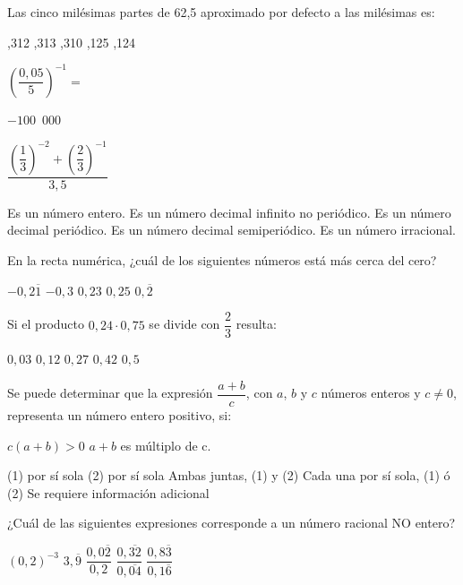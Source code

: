 \documentclass[pagina vacia]{srs}
\begin{document}
\begin{preguntas}[after-item-skip=1cm]
\pregunta Las cinco milésimas partes de 62,5 aproximado por defecto a las milésimas es:
\begin{vertical}
,312
,313
,310
,125
,124
\end{vertical}

\pregunta \( \left(\dfrac{0,05}{5}\right)^{-1} = \)
\begin{vertical}
\alternativa $-100$
\,000
\end{vertical}

\pregunta \( \dfrac{\left(\dfrac{1}{3}\right)^{-2} + \left(\dfrac{2}{3}\right)^{-1}}{3,5} \)
\begin{vertical}
\alternativa Es un número entero.
\alternativa Es un número decimal infinito no periódico.
\alternativa Es un número decimal periódico.
\alternativa Es un número decimal semiperiódico.
\alternativa Es un número irracional.
\end{vertical}

\pregunta En la recta numérica, ¿cuál de los siguientes números está más cerca del cero?
\begin{vertical}
\alternativa $-0,2\overline{1}$
\alternativa $-0,3$
\alternativa $0,23$
\alternativa $0,25$
\alternativa $0,\overline{2}$
\end{vertical}

\pregunta Si el producto \(0,24 \cdot 0,75\) se divide con \(\dfrac{2}{3}\) resulta:
\begin{vertical}
\alternativa $0,03$
\alternativa $0,12$
\alternativa $0,27$
\alternativa $0,42$
\alternativa $0,5$
\end{vertical}

\pregunta Se puede determinar que la expresión \(\dfrac{a+b}{c}\), con $a$, $b$ y $c$ números enteros
y \(c \neq 0\), representa un número entero positivo, si:
\begin{verticaln}
\alternativa \(c\left(a + b\right)>0\)
\alternativa \(a + b\) es múltiplo de c.
\end{verticaln}
\begin{vertical}
\alternativa (1) por sí sola
\alternativa (2) por sí sola
\alternativa Ambas juntas, (1) y (2)
\alternativa Cada una por sí sola, (1) ó (2)
\alternativa Se requiere información adicional
\end{vertical}

\pregunta ¿Cuál de las siguientes expresiones corresponde a un número racional NO entero?
\begin{vertical}
\alternativa \( (0,2)^{-3} \)
\alternativa \(3,\overline{9}\)
\alternativa \( \dfrac{0,0\overline{2}}{0,2} \)
\alternativa \( \dfrac{0,\overline{32}}{0,\overline{04}} \)
\alternativa \( \dfrac{0,8\overline{3}}{0,1\overline{6}} \)
\end{vertical}


\end{preguntas}
\end{document}
